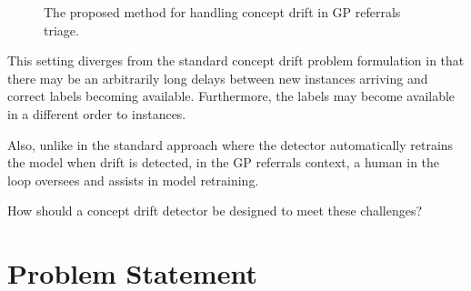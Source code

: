 \begin{figure}
    \caption{The proposed method for handling concept drift in GP referrals triage.}
    \label{fig:referrals_triage}
\end{figure}

This setting diverges from the standard concept drift problem formulation in that there may be an arbitrarily long delays between new instances arriving and correct labels becoming available. Furthermore, the labels may become available in a different order to instances.

Also, unlike in the standard approach where the detector automatically retrains the model when drift is detected, in the GP referrals context, a human in the loop oversees and assists in model retraining. 

How should a concept drift detector be designed to meet these challenges?

\section{Problem Statement}



